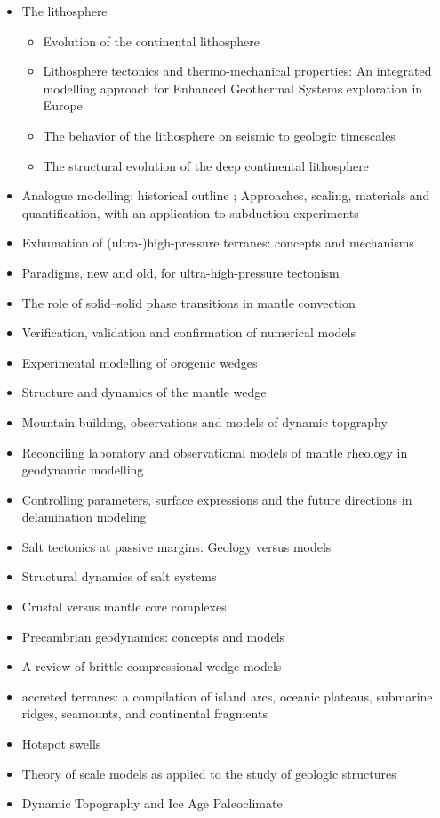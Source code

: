 \begin{itemize}
\item The lithosphere
   \begin{itemize}
   \item [\twothousandfive] Evolution of the continental lithosphere \cite{slee05}
   \item [\twothousandten] Lithosphere tectonics and thermo-mechanical properties: An integrated modelling
         approach for Enhanced Geothermal Systems exploration in Europe \cite{clvz10}
   \item [\twothousandthirteen] The behavior of the lithosphere on seismic to geologic timescales \cite{wazh13}
   \item [\twothousandseventeen] The structural evolution of the deep continental lithosphere \cite{comm17}
   \end{itemize}

\item Analogue modelling: historical outline \cite{koyi97}; Approaches, scaling, materials and quantification, with an application to subduction experiments \cite{scst16}
\item Exhumation of (ultra-)high-pressure terranes: concepts and mechanisms \cite{warr13}
\item Paradigms, new and old, for ultra-high-pressure tectonism \cite{hage13}
\item The role of solid–solid phase transitions in mantle convection \cite{fada17}
\item Verification, validation and confirmation of numerical models \cite{orsb94}
\item Experimental modelling of orogenic wedges \cite{grmd12}
\item Structure and dynamics of the mantle wedge \cite{vank03}
\item Mountain building, observations and models of dynamic topgraphy \cite{flgm13,fabc13}
\item Reconciling laboratory and observational models of mantle rheology in geodynamic modelling \cite{king16}
\item Controlling parameters, surface expressions and the future directions in delamination modeling \cite{goue18}
\item Salt tectonics at passive margins: Geology versus models \cite{brfo11}
\item Structural dynamics of salt systems \cite{javs94}
\item Crustal versus mantle core complexes \cite{brst18}
\item Precambrian geodynamics: concepts and models \cite{gery14}
\item A review of brittle compressional wedge models \cite{buit12}
\item accreted terranes: a compilation of island arcs, oceanic
      plateaus, submarine ridges, seamounts, and continental fragments \cite{tebu14}
\item Hotspot swells \cite{kiad14}
\item Theory of scale models as applied to the study of geologic structures \cite{hubb37}
\item Dynamic Topography and Ice Age Paleoclimate \cite{miac20}
\end{itemize}

